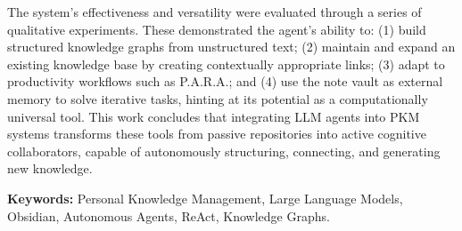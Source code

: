 The system's effectiveness and versatility were evaluated through a series of qualitative experiments. These demonstrated the agent's ability to: (1) build structured knowledge graphs from unstructured text; (2) maintain and expand an existing knowledge base by creating contextually appropriate links; (3) adapt to productivity workflows such as P.A.R.A.; and (4) use the note vault as external memory to solve iterative tasks, hinting at its potential as a computationally universal tool. This work concludes that integrating LLM agents into PKM systems transforms these tools from passive repositories into active cognitive collaborators, capable of autonomously structuring, connecting, and generating new knowledge.

\vspace{1cm}
\textbf{Keywords:} Personal Knowledge Management, Large Language Models, Obsidian, Autonomous Agents, ReAct, Knowledge Graphs.